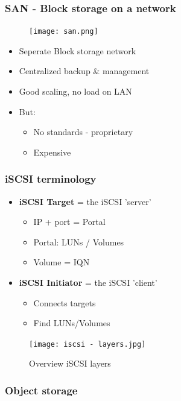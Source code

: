 \documentclass{article}
\begin{document}
\subsubsection{SAN - Block storage on a network}

\begin{figure}[H]
    \centering
    \texttt{[image: san.png]}
\end{figure}

\begin{itemize}
    \item Seperate Block storage network
    \item Centralized backup \& management
    \item Good scaling, no load on LAN
    \item But:
    \begin{itemize}
        \item No standards - proprietary
        \item Expensive
    \end{itemize}
\end{itemize}

\subsubsection{iSCSI terminology}

\begin{itemize}
    \item \textbf{iSCSI Target} = the iSCSI 'server'
    \begin{itemize}
        \item IP + port = Portal
        \item Portal: LUNs / Volumes
        \item Volume = IQN 
    \end{itemize}
    \item \textbf{iSCSI Initiator} = the iSCSI 'client'
    \begin{itemize}
        \item Connects targets
        \item Find LUNs/Volumes
    \end{itemize}
\end{itemize}

\begin{figure}[H]
    \centering
    \texttt{[image: iscsi - layers.jpg]}
    \caption{Overview iSCSI layers}
\end{figure}

\subsubsection{Object storage}
\end{document}
